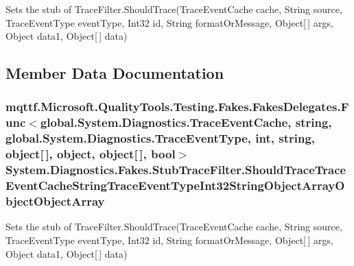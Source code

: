 Sets the stub of Trace\-Filter.\-Should\-Trace(\-Trace\-Event\-Cache cache, String source, Trace\-Event\-Type event\-Type, Int32 id, String format\-Or\-Message, Object\mbox{[}$\,$\mbox{]} args, Object data1, Object\mbox{[}$\,$\mbox{]} data)



\subsection{Member Data Documentation}
\hypertarget{class_system_1_1_diagnostics_1_1_fakes_1_1_stub_trace_filter_a5b3c9e3c07461ff804f813bc5b460659}{
\subsubsection[{Should\-Trace\-Trace\-Event\-Cache\-String\-Trace\-Event\-Type\-Int32\-String\-Object\-Array\-Object\-Object\-Array}]{\setlength{\rightskip}{0pt plus 5cm}mqttf.\-Microsoft.\-Quality\-Tools.\-Testing.\-Fakes.\-Fakes\-Delegates.\-Func$<$global.\-System.\-Diagnostics.\-Trace\-Event\-Cache, string, global.\-System.\-Diagnostics.\-Trace\-Event\-Type, int, string, object\mbox{[}$\,$\mbox{]}, object, object\mbox{[}$\,$\mbox{]}, bool$>$ System.\-Diagnostics.\-Fakes.\-Stub\-Trace\-Filter.\-Should\-Trace\-Trace\-Event\-Cache\-String\-Trace\-Event\-Type\-Int32\-String\-Object\-Array\-Object\-Object\-Array}}\label{class_system_1_1_diagnostics_1_1_fakes_1_1_stub_trace_filter_a5b3c9e3c07461ff804f813bc5b460659}


Sets the stub of Trace\-Filter.\-Should\-Trace(\-Trace\-Event\-Cache cache, String source, Trace\-Event\-Type event\-Type, Int32 id, String format\-Or\-Message, Object\mbox{[}$\,$\mbox{]} args, Object data1, Object\mbox{[}$\,$\mbox{]} data)




